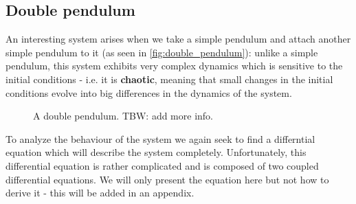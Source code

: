 
\subsection{Double pendulum}
An interesting system arises when we take a simple pendulum and attach another simple pendulum to it (as seen in \autoref{fig:double_pendulum}): unlike a simple pendulum, this system exhibits very complex dynamics which is sensitive to the initial conditions - i.e. it is \textbf{chaotic}, meaning that small changes in the initial conditions evolve into big differences in the dynamics of the system.

\begin{figure}
	\begin{center}
	\end{center}
	\caption{A double pendulum. TBW: add more info.}
	\label{fig:double_pendulum}
\end{figure}

To analyze the behaviour of the system we again seek to find a differntial equation which will describe the system completely. Unfortunately, this differential equation is rather complicated and is composed of two coupled differential equations. We will only present the equation here but not how to derive it - this will be added in an appendix.

